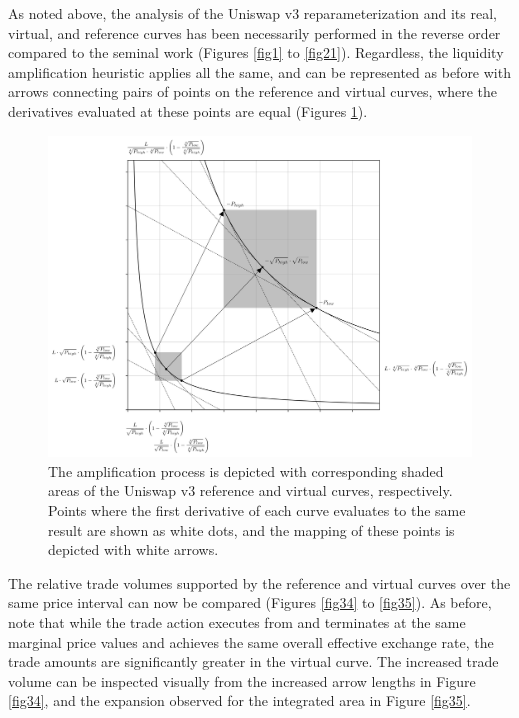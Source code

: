 \documentclass{article}
\begin{document}
As noted above, the analysis of the Uniswap v3 reparameterization and its real, virtual, and reference curves has been necessarily performed in the reverse order compared to the seminal work (Figures \ref{fig1} to \ref{fig21}). Regardless, the liquidity amplification heuristic applies all the same, and can be represented as before with arrows connecting pairs of points on the reference and virtual curves, where the derivatives evaluated at these points are equal (Figures \ref{fig33}).

\begin{figure}[ht]
    \centering
    \includegraphics[width=\textwidth]{fig33.png}
    \captionsetup{
        justification=raggedright,
        singlelinecheck=false,
        font=small,
        labelfont=bf,
        labelsep=quad,
        format=plain
    }
    \caption{The amplification process is depicted with corresponding shaded areas of the Uniswap v3 reference and virtual curves, respectively. Points where the first derivative of each curve evaluates to the same result are shown as white dots, and the mapping of these points is depicted with white arrows.}
    \label{fig33}
\end{figure}

The relative trade volumes supported by the reference and virtual curves over the same price interval can now be compared (Figures \ref{fig34} to \ref{fig35}). As before, note that while the trade action executes from and terminates at the same marginal price values and achieves the same overall effective exchange rate, the trade amounts are significantly greater in the virtual curve. The increased trade volume can be inspected visually from the increased arrow lengths in Figure \ref{fig34}, and the expansion observed for the integrated area in Figure \ref{fig35}.
\end{document}
